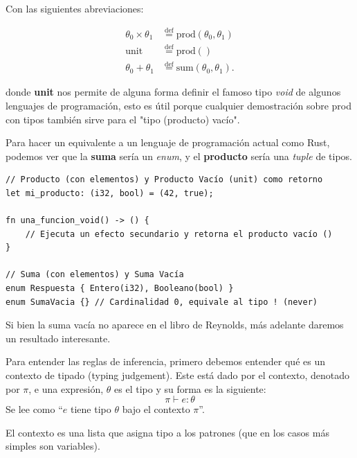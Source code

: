 \documentclass[runningheads]{llncs}
\begin{document}
Con las siguientes abreviaciones:

\begin{align*}
\theta_0 \times \theta_1 &\stackrel{\text{def}}{=} \text{prod}(\theta_0, \theta_1) \\
\text{unit} &\stackrel{\text{def}}{=} \text{prod}() \\
\theta_0 + \theta_1 &\stackrel{\text{def}}{=} \text{sum}(\theta_0, \theta_1).
\end{align*}

donde \textbf{unit} nos permite de alguna forma definir el famoso tipo \textit{void} de algunos lenguajes de programación, esto es útil porque cualquier demostración sobre prod con tipos también sirve para el "tipo (producto) vacío".

Para hacer un equivalente a un lenguaje de programación actual como Rust, podemos ver que la \textbf{suma} sería un \textit{enum}, y el \textbf{producto} sería una \textit{tuple} de tipos.

\begin{lstlisting}
// Producto (con elementos) y Producto Vacío (unit) como retorno
let mi_producto: (i32, bool) = (42, true); 

fn una_funcion_void() -> () {
    // Ejecuta un efecto secundario y retorna el producto vacío ()
}

// Suma (con elementos) y Suma Vacía
enum Respuesta { Entero(i32), Booleano(bool) }
enum SumaVacia {} // Cardinalidad 0, equivale al tipo ! (never)
\end{lstlisting}

Si bien la suma vacía no aparece en el libro de Reynolds, más adelante daremos un resultado interesante.

Para entender las reglas de inferencia, primero debemos entender qué es un contexto de tipado (typing judgement). Este está dado por el contexto, denotado por $\pi$, e una expresión, $\theta$ es el tipo y su forma es la siguiente:
	$$\pi \vdash  e : \theta$$
Se lee como “$e$ tiene tipo $\theta$ bajo el contexto $\pi$”.

El contexto es una lista que asigna tipo a los patrones (que en los casos más simples son variables).
\end{document}
